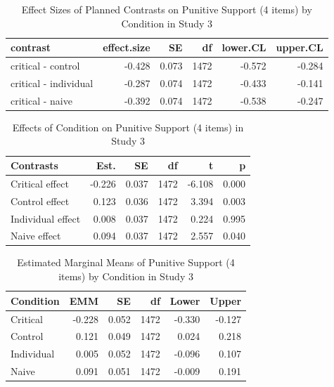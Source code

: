 \documentclass[
]{book}
\begin{document}
\begin{table}

\caption{\label{tab:pun4-contrast-s3}Effect Sizes of Planned Contrasts on Punitive Support (4 items) by Condition in Study 3}
\centering
\fontsize{13}{15}\selectfont
\begin{tabular}[t]{lrrrrr}
\toprule
contrast & effect.size & SE & df & lower.CL & upper.CL\\
\midrule
critical - control & -0.428 & 0.073 & 1472 & -0.572 & -0.284\\
critical - individual & -0.287 & 0.074 & 1472 & -0.433 & -0.141\\
critical - naive & -0.392 & 0.074 & 1472 & -0.538 & -0.247\\
\bottomrule
\end{tabular}
\end{table}

\begin{table}

\caption{\label{tab:pun4-contrast-s3}Effects of Condition on Punitive Support (4 items) in Study 3}
\centering
\fontsize{13}{15}\selectfont
\begin{tabular}[t]{lrrrrr}
\toprule
Contrasts & Est. & SE & df & t & p\\
\midrule
Critical effect & -0.226 & 0.037 & 1472 & -6.108 & 0.000\\
Control effect & 0.123 & 0.036 & 1472 & 3.394 & 0.003\\
Individual effect & 0.008 & 0.037 & 1472 & 0.224 & 0.995\\
Naive effect & 0.094 & 0.037 & 1472 & 2.557 & 0.040\\
\bottomrule
\end{tabular}
\end{table}

\begin{table}

\caption{\label{tab:pun4-contrast-s3}Estimated Marginal Means of Punitive Support (4 items) by Condition in Study 3}
\centering
\fontsize{13}{15}\selectfont
\begin{tabular}[t]{lrrrrr}
\toprule
Condition & EMM & SE & df & Lower & Upper\\
\midrule
Critical & -0.228 & 0.052 & 1472 & -0.330 & -0.127\\
Control & 0.121 & 0.049 & 1472 & 0.024 & 0.218\\
Individual & 0.005 & 0.052 & 1472 & -0.096 & 0.107\\
Naive & 0.091 & 0.051 & 1472 & -0.009 & 0.191\\
\bottomrule
\end{tabular}
\end{table}
\end{document}
